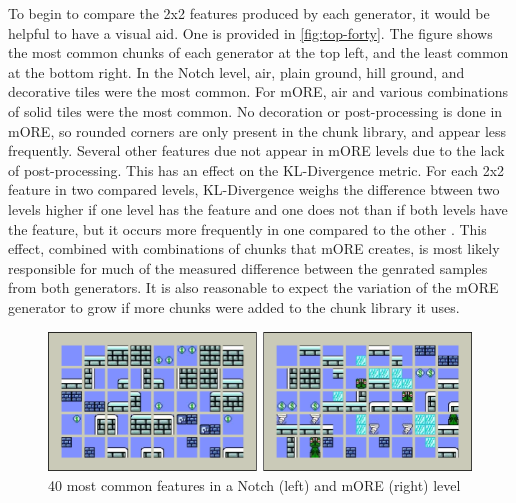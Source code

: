 To begin to compare the 2x2 features produced by each generator, it would be helpful to have
a visual aid. One is provided in \autoref{fig:top-forty}. The figure shows the most common
chunks of each generator at the top left, and the least common at the bottom right. In the
Notch level, air, plain ground, hill ground, and decorative tiles were the most common. For
mORE, air and various combinations of solid tiles were the most common. No decoration or
post-processing is done in mORE, so rounded corners are only present in the chunk library,
and appear less frequently. Several other features due not appear in mORE levels due to the 
lack of post-processing. This has an effect on the KL-Divergence metric. For each 2x2 feature
in two compared levels, KL-Divergence weighs the difference btween two levels higher if one
level has the feature and one does not than if both levels have the feature, but it occurs
more frequently in one compared to the other \cite{lucas2019}. This effect, combined with
combinations of chunks that mORE creates, is most likely responsible for much of the measured
difference between the genrated samples from both generators. It is also reasonable to expect
the variation of the mORE generator to grow if more chunks were added to the chunk library
it uses.

\begin{figure}[h]
    \centering
    \includegraphics[width=\linewidth]{img/fig18-top40.png}
    \caption{40 most common features in a Notch (left) and mORE (right) level}
    \label{fig:top-forty}
\end{figure}


